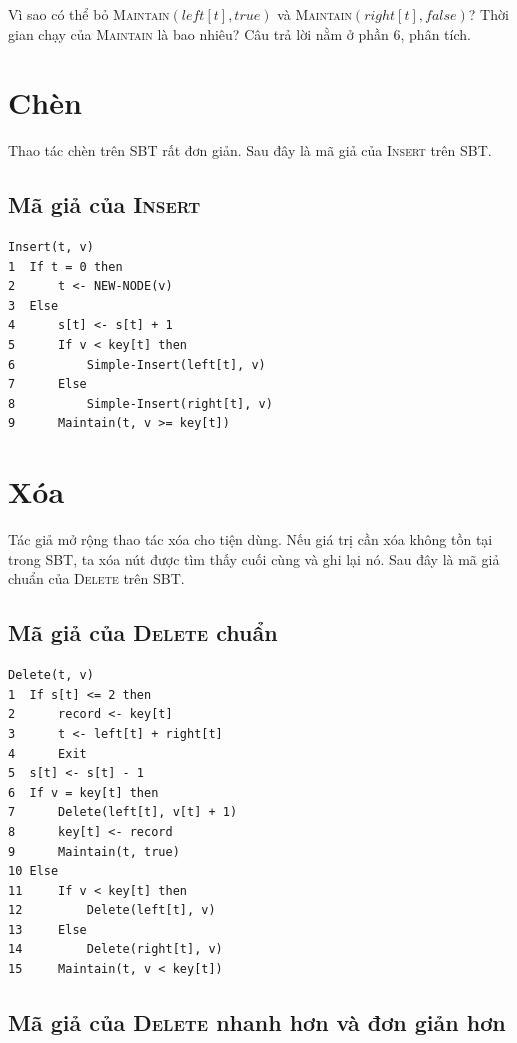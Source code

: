 \documentclass[11pt]{article}
\begin{document}
Vì sao có thể bỏ \textsc{Maintain}$(\mathit{left}[t],\textit{true})$ và
\textsc{Maintain}$(\mathit{right}[t],\textit{false})$? Thời gian chạy của
\textsc{Maintain} là bao nhiêu? Câu trả lời nằm ở phần 6, phân tích.

\section{Chèn}

Thao tác chèn trên SBT rất đơn giản. Sau đây là mã giả của \textsc{Insert}
trên SBT.

\subsection{Mã giả của \textsc{Insert}}

\begin{verbatim}
Insert(t, v)
1  If t = 0 then
2      t <- NEW-NODE(v)
3  Else
4      s[t] <- s[t] + 1
5      If v < key[t] then
6          Simple-Insert(left[t], v)
7      Else
8          Simple-Insert(right[t], v)
9      Maintain(t, v >= key[t])
\end{verbatim}

\section{Xóa}

Tác giả mở rộng thao tác xóa cho tiện dùng. Nếu giá trị cần xóa không tồn tại
trong SBT, ta xóa nút được tìm thấy cuối cùng và ghi lại nó. Sau đây là mã
giả chuẩn của \textsc{Delete} trên SBT.

\subsection{Mã giả của \textsc{Delete} chuẩn}

\begin{verbatim}
Delete(t, v)
1  If s[t] <= 2 then
2      record <- key[t]
3      t <- left[t] + right[t]
4      Exit
5  s[t] <- s[t] - 1
6  If v = key[t] then
7      Delete(left[t], v[t] + 1)
8      key[t] <- record
9      Maintain(t, true)
10 Else
11     If v < key[t] then
12         Delete(left[t], v)
13     Else
14         Delete(right[t], v)
15     Maintain(t, v < key[t])
\end{verbatim}

\subsection{Mã giả của \textsc{Delete} nhanh hơn và đơn giản hơn}
\end{document}
